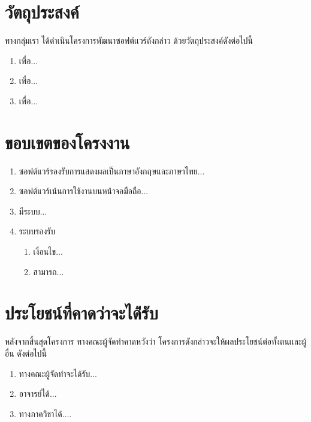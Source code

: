 \documentclass[12pt,one side,openright,a4paper]{cpe-thesis-th}
\begin{document}
\section{วัตถุประสงค์}
    ทางกลุ่มเรา ได้ดำเนินโครงการพัฒนาซอฟต์เเวร์ดังกล่าว ด้วยวัตถุประสงค์ดังต่อไปนี้
    \begin{enumerate}
        \item เพื่อ...
        \item เพื่อ...
        \item เพื่อ...
    \end{enumerate}

\section{ขอบเขตของโครงงาน}
    \begin{enumerate}
        \item ซอฟต์แวร์รองรับการแสดงผลเป็นภาษาอังกฤษและภาษาไทย...
        \item ซอฟต์แวร์เน้นการใช้งานบนหน้าจอมือถือ...
        \item มีระบบ...
        \item ระบบรองรับ
        \begin{enumerate}
            \item เงื่อนไข...
            \item สามารถ...
        \end{enumerate}
    \end{enumerate}

\section{ประโยชน์ที่คาดว่าจะได้่รับ}
    หลังจากสิ้นสุดโครงการ ทางคณะผู้จัดทำคาดหวังว่า โครงการดังกล่าวจะให้ผลประโยชน์ต่อทั้งตนเเละผู้อื่น ดังต่อไปนี้
    \begin{enumerate}
        \item ทางคณะผู้จัดทำจะได้รับ...
        \item อาจารย์ได้...
        \item ทางภาควิชาได้....
    \end{enumerate}

\pagebreak
\end{document}
